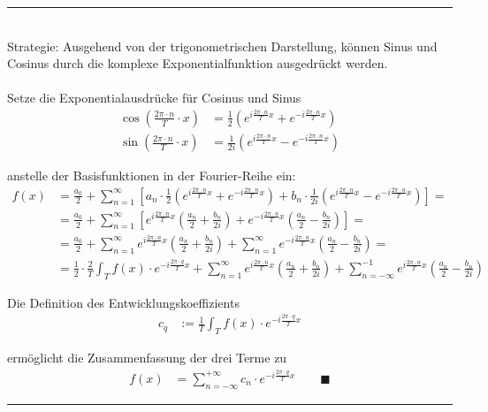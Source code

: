 \documentclass{article}
\newcommand{\lr}[1]{\left(#1\right)}
\newcommand{\lreck}[1]{\left[#1\right]}
\begin{document}
{\color{violet}
\hrule
	\\
	Strategie: Ausgehend von der trigonometrischen Darstellung, können Sinus und Cosinus durch die komplexe Exponentialfunktion ausgedrückt werden.\\
	\\
	Setze die Exponentialausdrücke für Cosinus und Sinus
		\begin{align*}
			\cos \lr{ \frac{2\pi \cdot n}{T} \cdot x } &= \frac{1}{2} \lr{ e^{i \frac{2\pi \cdot n}{T} x} + e^{-i \frac{2\pi \cdot n}{T} x} } \\
			\sin \lr{ \frac{2\pi \cdot n}{T} \cdot x } &= \frac{1}{2i} \lr{ e^{i \frac{2\pi \cdot n}{T} x} - e^{-i \frac{2\pi \cdot n}{T} x} }
		\end{align*}

	anstelle der Basisfunktionen in der Fourier-Reihe ein:
		\begin{align*}
			f(x) &= \frac{a_0}{2} + \sum_{n=1}^\infty \lreck{ a_n \cdot \frac{1}{2} \lr{ e^{i \frac{2\pi \cdot n}{T} x} + e^{-i \frac{2\pi \cdot n}{T} x} } + b_n \cdot \frac{1}{2i} \lr{ e^{i \frac{2\pi \cdot n}{T} x} - e^{-i \frac{2\pi \cdot n}{T} x} } } = \\
			&= \frac{a_0}{2} + \sum_{n=1}^\infty \lreck{ e^{i \frac{2\pi \cdot n}{T} x} \lr{ \frac{a_n}{2} + \frac{b_n}{2i} } + e^{-i \frac{2\pi \cdot n}{T} x} \lr{ \frac{a_n}{2} - \frac{b_n}{2i} } } = \\
			&= \frac{a_0}{2} + \sum_{n=1}^\infty e^{i \frac{2\pi \cdot n}{T} x} \lr{ \frac{a_n}{2} + \frac{b_n}{2i} } + \sum_{n=1}^\infty e^{-i \frac{2\pi \cdot n}{T} x} \lr{ \frac{a_n}{2} - \frac{b_n}{2i} } = \\
			&= \frac{1}{2} \cdot \frac{2}{T} \int_T f(x) \cdot e^{-i \frac{2\pi \cdot q}{T} x} + \sum_{n=1}^\infty e^{i \frac{2\pi \cdot n}{T} x} \lr{ \frac{a_n}{2} + \frac{b_n}{2i} } + \sum_{n=-\infty}^{-1} e^{i \frac{2\pi \cdot n}{T} x} \lr{ \frac{a_n}{2} - \frac{b_n}{2i} }
		\end{align*}
	
	Die Definition des Entwicklungskoeffizients
		\begin{align*}
			c_q &:= \frac{1}{T} \int_T f(x) \cdot e^{-i \frac{2\pi \cdot q}{T} x}
		\end{align*}
	
	ermöglicht die Zusammenfassung der drei Terme zu
		\begin{align*}
			f(x) &= \sum_{n=-\infty}^{+\infty} c_n \cdot e^{-i \frac{2\pi \cdot q}{T} x} \qquad \blacksquare
		\end{align*}


\hrule
}
\end{document}
